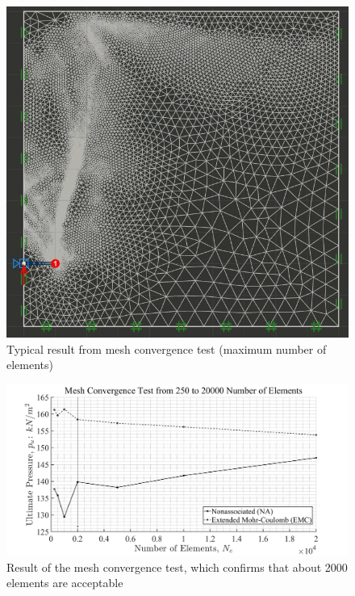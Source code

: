 \documentclass[a4paper, nobind]{templates/ociamthesis}
\begin{document}
\begin{figure}[H]
\includegraphics[width=1\linewidth]{myfigureeeeee/20000} \caption{Typical result from mesh convergence test (maximum number of elements)}\label{fig:unnamed-chunk-13}
\end{figure}

\begin{figure}[H]
\includegraphics[width=1\linewidth]{myfigureeeeee/meshresult} \caption{Result of the mesh convergence test, which confirms that about 2000 elements are acceptable}\label{fig:unnamed-chunk-14}
\end{figure}
\end{document}
